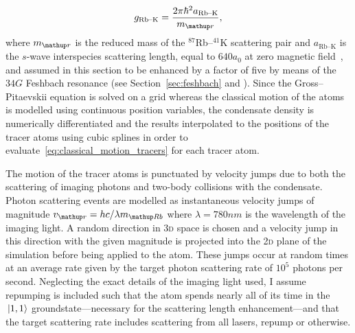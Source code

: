 \begin{align}
g_{\textrm{Rb--K}} = \frac{2\pi\hbar^2 a_{\textrm{Rb--K}}}{m_\up{r}},
\end{align}
where $m_\up{r}$ is the reduced mass of the $^{87}$Rb--$^{41}$K scattering pair and 
$a_{\textrm{Rb--K}}$ is the $s$-wave interspecies scattering length, equal to $640 a_0$ at zero magnetic field~\cite{thalhammer_double_2008}, and assumed in this section to be enhanced by a factor of five by means of the $34\unit{G}$ Feshbach resonance (see Section~\ref{sec:feshbach} and ). Since the Gross--Pitaevskii equation is solved on a grid whereas the classical motion of the atoms is modelled using continuous position variables, the condensate density is numerically differentiated and the results interpolated to the positions of the tracer atoms using cubic splines in order to evaluate~\eqref{eq:classical_motion_tracers} for each tracer atom.


The motion of the tracer atoms is punctuated by velocity jumps due to both the scattering of imaging photons and two-body collisions with the condensate. Photon scattering events are modelled as instantaneous velocity jumps of magnitude $v_\up{r} = hc/\lambda m_\up{Rb}$ where $\lambda=780\unit{nm}$ is the wavelength of the imaging light. A random direction in \textsc{3d} space is chosen and a velocity jump in this direction with the given magnitude is projected into the \textsc{2d} plane of the simulation before being applied to the atom. These jumps occur at random times at an average rate given by the target photon scattering rate of $10^5$ photons per second. Neglecting the exact details of the imaging light used, I assume repumping is included such that the atom spends nearly all of its time in the $\ket{1, 1}$ groundstate---necessary for the scattering length enhancement---and that the target scattering rate includes scattering from all lasers, repump or otherwise.

